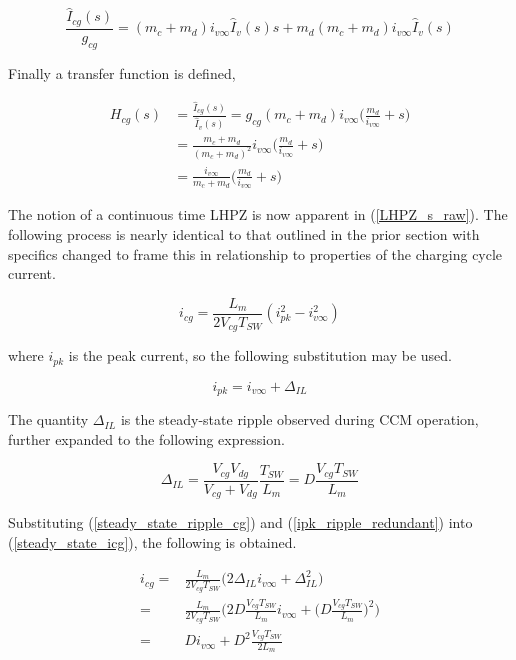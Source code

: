 \documentclass[conference]{IEEEtran}
\begin{document}
\begin{equation}
\frac{\hat{I}_{cg}(s)}{g_{cg}} =  (m_c + m_d) i_{v\infty}\hat{I}_{v}(s)s + m_d( m_c + m_d ) i_{v\infty} \hat{I}_{v}(s)
\label{ivcg_laplace}
\end{equation}

Finally a transfer function is defined,

\begin{align}
H_{cg} (s) &= \frac{\hat{I}_{cg}(s)}{\hat{I}_{v}(s)} =  g_{cg} (m_c + m_d) i_{v\infty}
\big (\frac{m_d}{i_{v\infty}} + s \big ) \nonumber\\
&= \frac{m_c + m_d}{(m_c + m_d)^2} i_{v\infty}
\big (\frac{m_d}{i_{v\infty}} + s \big ) \nonumber \\
&= \frac{i_{v\infty}}{m_c + m_d}
\big (\frac{m_d}{i_{v\infty}} + s \big )
\label{LHPZ_s_raw}
\end{align}

The notion of a continuous time LHPZ is now apparent in (\ref{LHPZ_s_raw}).  The following process is nearly identical to that outlined in the prior section with specifics changed to frame this in relationship to properties of the charging cycle current.

\begin{equation}
i_{cg} = \frac{L_m}{2V_{cg}T_{SW}} (i_{pk}^2 - i_{v\infty}^2)
\label{steady_state_icg}
\end{equation}

where $i_{pk}$ is the peak current, so the following substitution may be used.

\begin{equation}
i_{pk} = i_{v\infty} + \Delta_{IL}
\label{ipk_ripple_redundant}
\end{equation}

The quantity $\Delta_{IL}$ is the steady-state ripple observed during CCM operation, further expanded to the following expression.

\begin{equation}
\Delta_{IL} = \frac{V_{cg}V_{dg}}{V_{cg} + V_{dg}} \frac{T_{SW}}{L_m} =
D\frac{V_{cg} T_{SW}}{L_m}
\label{steady_state_ripple_cg}
\end{equation}

Substituting (\ref{steady_state_ripple_cg}) and (\ref{ipk_ripple_redundant}) into (\ref{steady_state_icg}), the following is obtained.

\begin{align}
i_{cg} =& \frac{L_m}{2V_{cg}T_{SW}} \bigg(2\Delta_{IL} i_{v\infty} + \Delta_{IL}^2 \bigg) \nonumber \\
=& \frac{L_m}{2V_{cg}T_{SW}} \bigg(2 D\frac{V_{cg} T_{SW}}{L_m} i_{v\infty} + \bigg(D\frac{V_{cg} T_{SW}}{L_m}\bigg)^2\bigg) \nonumber \\
=&  D i_{v\infty} + D^2\frac{V_{cg} T_{SW}}{2L_m}
\end{align}
\end{document}
